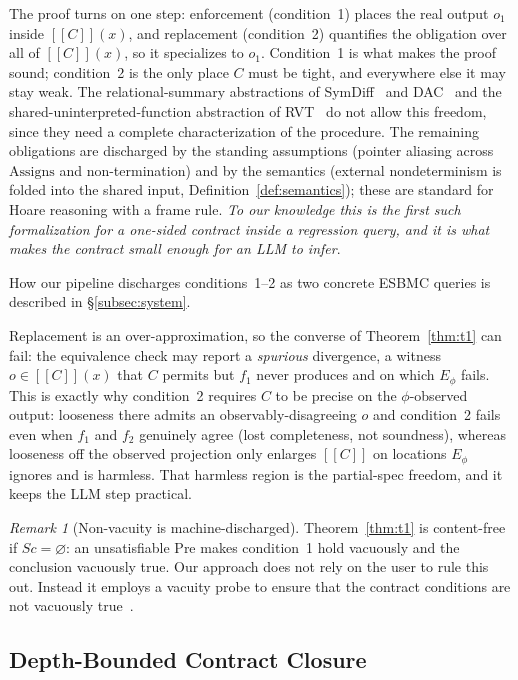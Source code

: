 \documentclass[conference]{IEEEtran}
\theoremstyle{definition}
\theoremstyle{remark}
\newtheorem{remark}{Remark}
\newcommand{\sem}[1]{[\![#1]\!]}
\begin{document}
The proof turns on one step: enforcement
(condition~1) places the real
output $o_1$ inside $\sem{C}(x)$, and replacement (condition~2)
quantifies the obligation over all of $\sem{C}(x)$, so it specializes
to $o_1$. Condition~1 is what makes the proof sound; condition~2 is the
only place $C$ must be tight, and everywhere else it may stay weak.
The relational-summary abstractions of
SymDiff~\cite{lahiri2012symdiff} and DAC~\cite{lahiri2013dac} and the
shared-uninterpreted-function abstraction of RVT~\cite{godlin2013rv} do
not allow this freedom, since they need a complete characterization of
the procedure. The remaining obligations are discharged by the standing
assumptions (pointer aliasing across $\text{Assigns}$ and
non-termination) and by the semantics (external nondeterminism is folded
into the shared input, Definition~\ref{def:semantics}); these are
standard for Hoare reasoning with a frame rule. \textit{To our knowledge this is
  the first such formalization for a one-sided contract inside a
  regression query, and it is what makes the contract small enough for an
LLM to infer}.

How our pipeline discharges conditions~1--2 as two concrete ESBMC queries
is described in \S\ref{subsec:system}.

Replacement is an over-approximation, so the converse of
Theorem~\ref{thm:t1} can fail: the equivalence check may report a
\emph{spurious} divergence, a witness $o\in\sem{C}(x)$ that $C$ permits
but $f_1$ never produces and on which $E_\phi$ fails. This is exactly
why condition~2 requires $C$ to be precise on the
$\phi$-observed output: looseness there admits an observably-disagreeing
$o$ and condition~2 fails even when $f_1$ and $f_2$ genuinely agree
(lost completeness, not soundness), whereas looseness off the observed
projection only enlarges $\sem{C}$ on locations $E_\phi$ ignores and
is harmless. That harmless region is the partial-spec freedom, and it
keeps the LLM step practical.

\begin{remark}[Non-vacuity is machine-discharged]\label{rem:vacuity}
  Theorem~\ref{thm:t1} is content-free if $\mathit{Sc}=\varnothing$:
  an unsatisfiable $\text{Pre}$ makes condition~1 hold vacuously and
  the conclusion vacuously true. Our approach does not rely on
  the user to rule this out. Instead it employs a vacuity probe to ensure
  that the contract conditions are not vacuously
  true~\cite{beer1997efficient}.
\end{remark}

\subsection{Depth-Bounded Contract Closure}\label{sec:depth-bounded-closure}
\end{document}
